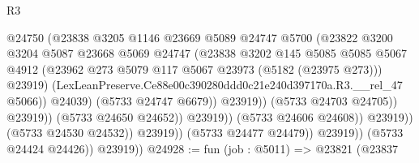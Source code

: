 \begin{lexlean}{R3}
\begin{coremodule}
                                              @24750
                                              (@23838
                                                @3205
                                                @1146
                                                @23669
                                                @5089
                                                @24747
                                                @5700
                                                (@23822
                                                  @3200
                                                  @3204
                                                  @5087
                                                  @23668
                                                  @5069
                                                  @24747
                                                  (@23838
                                                    @3202
                                                    @145
                                                    @5085
                                                    @5085
                                                    @5067
                                                    @4912
                                                    (@23962
                                                      @273
                                                      @5079
                                                      @117
                                                      @5067
                                                      @23973
                                                      (@5182 (@23975 @273)))
                                                    @23919)
                                                  (LexLeanPreserve.Ce88e00c390280ddd0c21e240d397170a.R3.__rel_47
                                                    @5066))
                                                @24039)
                                              (@5733 @24747 @6679))
                                            @23919))
                                        (@5733 @24703 @24705))
                                      @23919))
                                  (@5733 @24650 @24652))
                                @23919))
                            (@5733 @24606 @24608))
                          @23919))
                      (@5733 @24530 @24532))
                    @23919))
                (@5733 @24477 @24479))
              @23919))
          (@5733 @24424 @24426))
        @23919))
@24928 := fun (job : @5011) =>
  @23821
    (@23837

\end{coremodule}
\end{lexlean}
